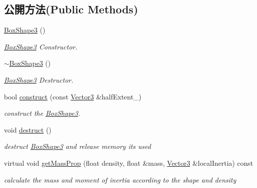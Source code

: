 \subsection*{公開方法(Public Methods)}
\begin{DoxyCompactItemize}
\item 
\hyperlink{class_i_dream_sky_1_1_box_shape3_a137fc4277ec6c9a2a87f1f919d8e831d}{Box\+Shape3} ()
\begin{DoxyCompactList}\small\item\em \hyperlink{class_i_dream_sky_1_1_box_shape3}{Box\+Shape3} Constructor. \end{DoxyCompactList}\item 
\hyperlink{class_i_dream_sky_1_1_box_shape3_a9c44670d3cc33ae3c0aa8d8c12495a96}{$\sim$\+Box\+Shape3} ()
\begin{DoxyCompactList}\small\item\em \hyperlink{class_i_dream_sky_1_1_box_shape3}{Box\+Shape3} Destructor. \end{DoxyCompactList}\item 
bool \hyperlink{class_i_dream_sky_1_1_box_shape3_afcb880918c47623a4487a353b3ee6de9}{construct} (const \hyperlink{class_i_dream_sky_1_1_vector3}{Vector3} \&half\+Extent\+\_\+)
\begin{DoxyCompactList}\small\item\em construct the \hyperlink{class_i_dream_sky_1_1_box_shape3}{Box\+Shape3}. \end{DoxyCompactList}\item 
void \hyperlink{class_i_dream_sky_1_1_box_shape3_a647ee110dbb44329caf171b7e9aed417}{destruct} ()\hypertarget{class_i_dream_sky_1_1_box_shape3_a647ee110dbb44329caf171b7e9aed417}{}\label{class_i_dream_sky_1_1_box_shape3_a647ee110dbb44329caf171b7e9aed417}

\begin{DoxyCompactList}\small\item\em destruct \hyperlink{class_i_dream_sky_1_1_box_shape3}{Box\+Shape3} and release memory its used \end{DoxyCompactList}\item 
virtual void \hyperlink{class_i_dream_sky_1_1_box_shape3_aeb4314532f69b7e03d98dacd2f374095}{get\+Mass\+Prop} (float density, float \&mass, \hyperlink{class_i_dream_sky_1_1_vector3}{Vector3} \&local\+Inertia) const 
\begin{DoxyCompactList}\small\item\em calculate the mass and moment of inertia according to the shape and density \end{DoxyCompactList}\end{DoxyCompactItemize}
